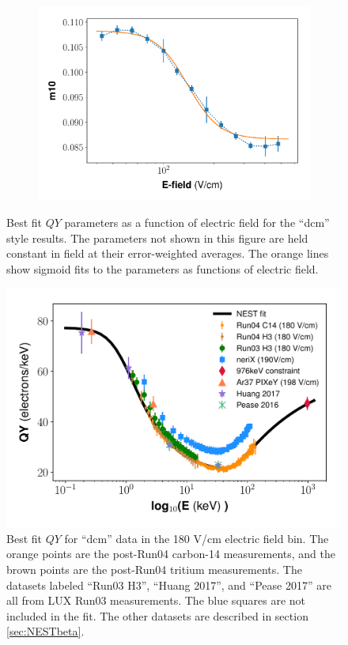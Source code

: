 \begin{figure}[h!]
\begin{subfigure}{0.45\textwidth}
  \includegraphics[width=\textwidth]{Figures/Yields_fit_old/NEST_m10_fit_old_dcm.pdf}
  \caption{}
\end{subfigure}
\caption{Best fit $QY$ parameters as a function of electric field for the ``dcm'' style results. The parameters not shown in this figure are held constant in field at their error-weighted averages. The orange lines show sigmoid fits to the parameters as functions of electric field.}
\label{fig:dcm_prelim_params}
\end{figure}


\begin{figure}[h!]
  \centering
  \includegraphics[width=\textwidth]{Figures/Yields_fit_old/NEST_fit_180Vcm_old_dcm.pdf}
  \caption{Best fit $QY$ for ``dcm'' data in the 180 V/cm electric field bin. The orange points are the post-Run04 carbon-14 measurements, and the brown points are the post-Run04 tritium measurements. The datasets labeled ``Run03 H3'', ``Huang 2017'', and ``Pease 2017'' are all from LUX Run03 measurements. The blue squares are not included in the fit. The other datasets are described in section \ref{sec:NESTbeta}.}
  \label{fig:dcm_prelim_QY180}
\end{figure}


